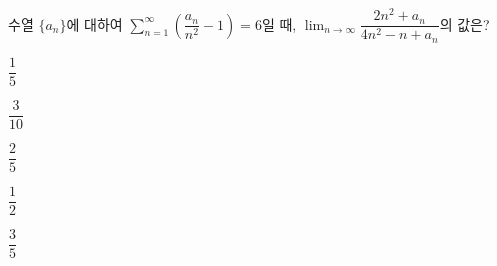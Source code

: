 수열 $\{a_n\}$에 대하여 $\displaystyle\sum_{n=1}^{\infty}\left(\dfrac{a_n}{n^2}-1\right)=6$일 때, $\displaystyle\lim_{n\to\infty}\dfrac{2n^2+a_n}{4n^2-n+a_n}$의 값은?
\begin{choices32}{\rule[-3ex]{0pt}{8ex}$\dfrac{1}{5}$}{\rule[-3ex]{0pt}{8ex}$\dfrac{3}{10}$}{\rule[-3ex]{0pt}{8ex}$\dfrac{2}{5}$}{\rule[-3ex]{0pt}{8ex}$\dfrac{1}{2}$}{\rule[-3ex]{0pt}{8ex}$\dfrac{3}{5}$}\end{choices32}
